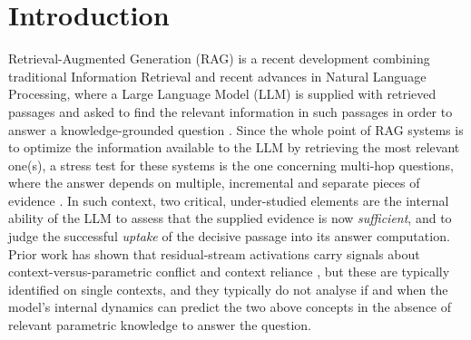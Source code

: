\section{Introduction}
Retrieval-Augmented Generation (RAG) is a recent development combining traditional Information Retrieval and recent advances in Natural Language Processing, where a Large Language Model (LLM) is supplied with retrieved passages and asked to find the relevant information in such passages in order to answer a knowledge-grounded question \cite{NEURIPS2020_6b493230}. Since the whole point of RAG systems is to optimize the information available to the LLM by retrieving the most relevant one(s), a stress test for these systems is the one concerning multi-hop questions, where the answer depends on multiple, incremental and separate pieces of evidence \cite{trivedi2022musique}. In such context, two critical, under-studied elements are the internal ability of the LLM to assess that the supplied evidence is now \emph{sufficient}, and to judge the successful \emph{uptake} of the decisive passage into its answer computation. Prior work has shown that residual-stream activations carry signals about context-versus-parametric conflict and context reliance \cite{context-vs-memory,SpARE}, but these are typically identified on single contexts, and they typically do not analyse if and when the model's internal dynamics can predict the two above concepts in the absence of relevant parametric knowledge to answer the question.


